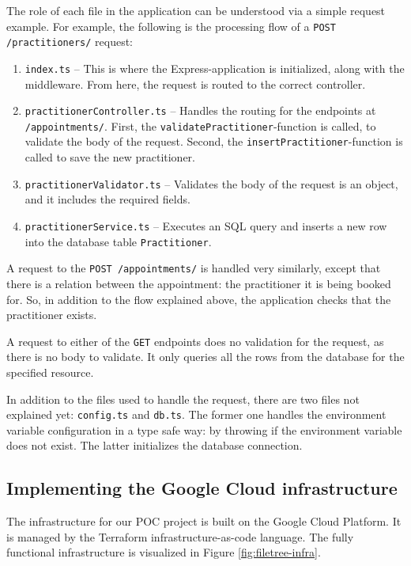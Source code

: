 The role of each file in the application can be understood via a simple request example.
For example, the following is the processing flow of a \texttt{POST /practitioners/} request:
\begin{enumerate}
    \item
    \texttt{index.ts} –
    This is where the Express-application is initialized, along with the middleware.
    From here, the request is routed to the correct controller.
    \item
    \texttt{practitionerController.ts} –
    Handles the routing for the endpoints at\\ \texttt{/appointments/}.
    First, the \texttt{validatePractitioner}-function is called, to validate the body of the request.
    Second, the \texttt{insertPractitioner}-function is called to save the new practitioner.
    \item
    \texttt{practitionerValidator.ts} –
    Validates the body of the request is an object, and it includes the required fields.
    \item
    \texttt{practitionerService.ts} –
    Executes an SQL query and inserts a new row into the database table \texttt{Practitioner}.
\end{enumerate}
A request to the \texttt{POST /appointments/} is handled very similarly, except that there is a relation between the appointment: the practitioner it is being booked for.
So, in addition to the flow explained above, the application checks that the practitioner exists.

A request to either of the \texttt{GET} endpoints does no validation for the request, as there is no body to validate.
It only queries all the rows from the database for the specified resource.

In addition to the files used to handle the request, there are two files not explained yet: \texttt{config.ts} and \texttt{db.ts}.
The former one handles the environment variable configuration in a type safe way: by throwing if the environment variable does not exist.
The latter initializes the database connection.

\subsection{Implementing the Google Cloud infrastructure}

The infrastructure for our POC project is built on the Google Cloud Platform.
It is managed by the Terraform infrastructure-as-code language.
The fully functional infrastructure is visualized in Figure \ref{fig:filetree-infra}.

